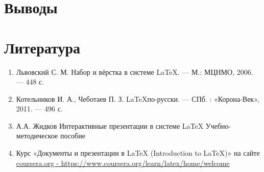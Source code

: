 \documentclass[14pt, a4paper]{extarticle}
\begin{document}
\section{Выводы}


\section{Литература}
\begin{enumerate} 
\item Львовский С. М. Набор и вёрстка в системе \LaTeX. — М.: МЦНМО, 2006. — 448 с.
\item Котельников И. А., Чеботаев П. З. \LaTeX по-русски. — СПб. : «Корона-Век», 2011. — 496 с.
\item А.А. Жидков Интерактивные презентации в системе \LaTeX
Учебно-методическое пособие
\item Курс «Документы и презентации в LaTeX (Introduction to \LaTeX)» на сайте \url{coursera.org - https://www.coursera.org/learn/latex/home/welcome}
\end{enumerate}
\end{document}
